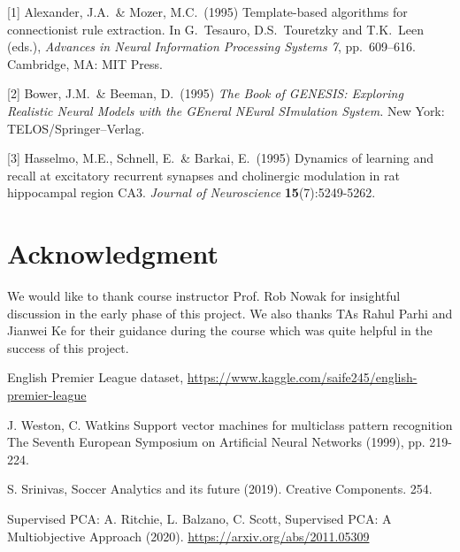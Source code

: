 \documentclass{article}
\begin{document}
\small

[1] Alexander, J.A.\ \& Mozer, M.C.\ (1995) Template-based algorithms for
connectionist rule extraction. In G.\ Tesauro, D.S.\ Touretzky and T.K.\ Leen
(eds.), {\it Advances in Neural Information Processing Systems 7},
pp.\ 609--616. Cambridge, MA: MIT Press.

[2] Bower, J.M.\ \& Beeman, D.\ (1995) {\it The Book of GENESIS: Exploring
  Realistic Neural Models with the GEneral NEural SImulation System.}  New York:
TELOS/Springer--Verlag.

[3] Hasselmo, M.E., Schnell, E.\ \& Barkai, E.\ (1995) Dynamics of learning and
recall at excitatory recurrent synapses and cholinergic modulation in rat
hippocampal region CA3. {\it Journal of Neuroscience} {\bf 15}(7):5249-5262.
\fi
\section*{Acknowledgment}
We would like to thank course instructor Prof. Rob Nowak for insightful discussion in the early phase of this project. We also thanks TAs Rahul Parhi  and Jianwei Ke for their guidance during the course which was quite helpful in the success of this project.

\begin{thebibliography}{}
	 English Premier League dataset, \href{https://www.kaggle.com/saife245/english-premier-league}{https://www.kaggle.com/saife245/english-premier-league}
	
	 J. Weston, C. Watkins
	Support vector machines for multiclass pattern recognition
	The Seventh European Symposium on Artificial Neural Networks (1999), pp. 219-224.
	
	 S. Srinivas, Soccer Analytics and its future (2019). Creative Components. 254.
	
	 Supervised PCA: A. Ritchie, L. Balzano, C. Scott,  Supervised PCA: A Multiobjective Approach (2020). \href{https://arxiv.org/abs/2011.05309}{https://arxiv.org/abs/2011.05309}
	
	
	
\end{thebibliography}
\end{document}
